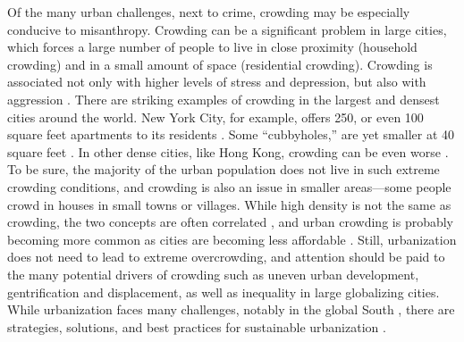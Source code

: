 \documentclass[11pt, letterpaper]{article}
\begin{document}
\begin{spacing}{1.4}
%
Of the many urban challenges, next to crime, crowding may be especially conducive to misanthropy.  
Crowding can be a significant problem in large cities, which forces a large number of people to live in close proximity (household crowding) and in a small amount of space (residential crowding). Crowding is associated not only with higher levels of stress and depression, but also with aggression \citep{regoeczi2008,calhoun62}. 
There are striking examples of crowding in the largest and densest cities around
the world. New York City, for example, offers 250, or even 100 square feet apartments to its residents
\citep{abc,yoneda,dailynews}. Some ``cubbyholes,'' are yet smaller at 40 square feet \citep{newyorktimes}. In other dense cities, like Hong Kong, crowding can be even worse \citep{newyorktimes2}. To be sure, the majority of the urban population does not live in such extreme crowding conditions, and crowding is also an issue in smaller areas---some people crowd in houses in small towns or villages.
  While high density is not the same as crowding, the two concepts are often
  correlated \citep{meyer13}, and urban crowding is probably becoming more
  common  as cities are becoming less affordable  \citep[e.g.,][]{misraCL15oct6,floridaCL18apr11,weinbergCL16aug11,solariMISC19apr24,schuetzMISC19may7,kotkin_db_mar20_13}. 
%    
 Still, urbanization does not need to lead to extreme overcrowding, and attention should be
 paid to the many potential drivers of crowding such as uneven urban
  development, gentrification and displacement, as well as inequality in large
  globalizing cities.
  While urbanization faces many challenges, notably in the global South \cite{hong21}, 
  there are strategies, solutions, and best practices for sustainable urbanization \citep{bauduceau2015towards, world2016urban,ochoa2018learning,tan2016sustainable}.

% 




\end{spacing}
\end{document}
